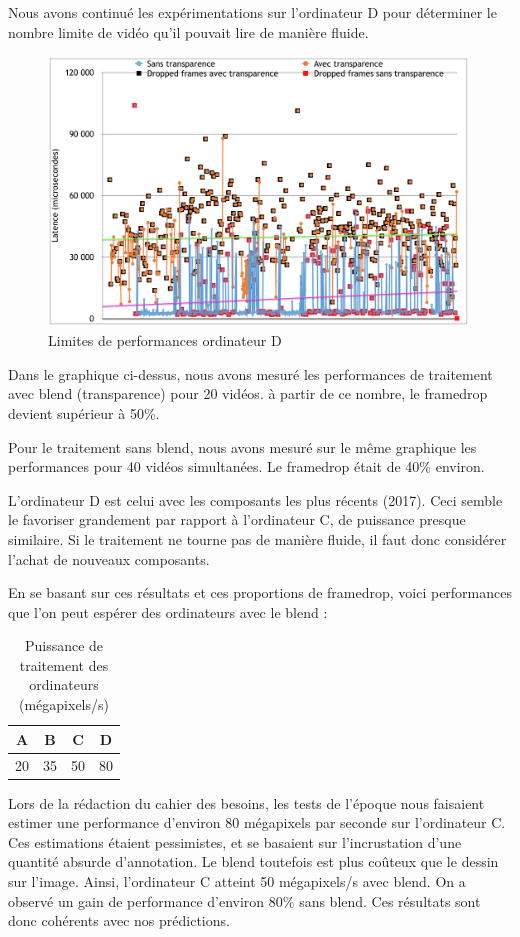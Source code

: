 Nous avons continué les expérimentations sur l'ordinateur D pour
déterminer le nombre limite de vidéo qu'il pouvait lire de
manière fluide. 

\begin{figure}[H]  
\begin{center}  
\includegraphics[scale=0.3]{images/video_eliott_20_48_40_37.png} 
\caption{Limites de performances ordinateur D}
\end{center}
\end{figure}

Dans le graphique ci-dessus, nous avons mesuré les performances
de traitement avec blend (transparence) pour 20 vidéos. à partir
de ce nombre, le framedrop devient supérieur à 50\%.
\bigskip

Pour le traitement sans blend, nous avons mesuré sur le même
graphique les performances pour 40 vidéos simultanées. Le
framedrop était de 40\% environ.
\bigskip

L'ordinateur D est celui avec les composants les plus récents
(2017). Ceci semble le favoriser grandement par rapport à
l'ordinateur C, de puissance presque similaire. Si le traitement
ne tourne pas de manière fluide, il faut donc considérer l'achat
de nouveaux composants.
\bigskip

En se basant sur ces résultats et ces proportions de framedrop,
voici performances que l'on peut espérer des ordinateurs avec le
blend : 


\begin{table}[H]
\centering
\caption{Puissance de traitement des ordinateurs (mégapixels/s)} 
\bigskip
\begin{tabular}{| c | c | c | c |}
     \hline
     A & B & C & D \\ \hline
     20 & 35 & 50 & 80 \\ \hline
\end{tabular}
\end{table}


Lors de la rédaction du cahier des besoins, les tests de l'époque
nous faisaient estimer une performance d'environ 80 mégapixels
par seconde sur l'ordinateur C. Ces estimations étaient
pessimistes, et se basaient sur l'incrustation d'une quantité
absurde d'annotation. Le blend toutefois est plus coûteux que le
dessin sur l'image. Ainsi, l'ordinateur C atteint 50 mégapixels/s
avec blend. On a observé un gain de performance d'environ 80\%
sans blend. Ces résultats sont donc cohérents avec nos
prédictions.

